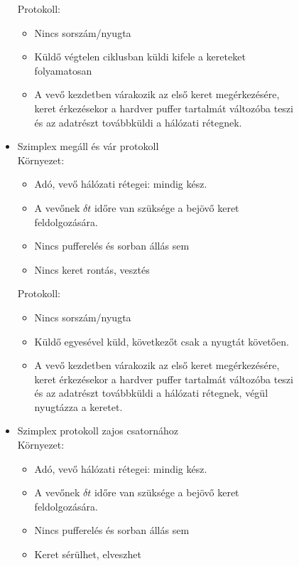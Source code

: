 \documentclass[margin=0px]{article}
\begin{document}
\begin{description}
\begin{description}
\begin{itemize}
                          Protokoll:
                          \begin{itemize}
                              \item Nincs sorszám/nyugta
                              \item Küldő végtelen ciklusban küldi kifele a kereteket folyamatosan
                              \item A vevő kezdetben várakozik az első keret megérkezésére, keret érkezésekor a hardver puffer tartalmát változóba teszi és az adatrészt továbbküldi a hálózati rétegnek.
                          \end{itemize}
                    \item Szimplex megáll és vár protokoll 	\\
                          Környezet:
                          \begin{itemize}
                              \item Adó, vevő hálózati rétegei: mindig kész.
                              \item A vevőnek $\delta t$ időre van szüksége a bejövő keret feldolgozására.
                              \item Nincs pufferelés és sorban állás sem
                              \item Nincs keret rontás, vesztés
                          \end{itemize}

                          Protokoll:
                          \begin{itemize}
                              \item Nincs sorszám/nyugta
                              \item Küldő egyesével küld, következőt csak a nyugtát követően.
                              \item A vevő kezdetben várakozik az első keret megérkezésére, keret érkezésekor a hardver puffer tartalmát változóba teszi és az adatrészt továbbküldi a hálózati rétegnek, végül nyugtázza a keretet.
                          \end{itemize}
                    \item Szimplex protokoll zajos csatornához\\
                          Környezet:
                          \begin{itemize}
                              \item Adó, vevő hálózati rétegei: mindig kész.
                              \item A vevőnek $\delta t$ időre van szüksége a bejövő keret feldolgozására.
                              \item Nincs pufferelés és sorban állás sem
                              \item Keret sérülhet, elveszhet
                          \end{itemize}


\end{itemize}
\end{description}
\end{description}
\end{document}
